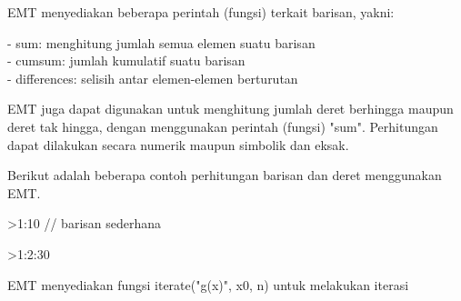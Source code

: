 \documentclass{article}
\begin{document}
\begin{eulernotebook}
\begin{eulercomment}
\begin{eulercomment}
\begin{eulercomment}
\begin{eulercomment}
\begin{eulercomment}
EMT menyediakan beberapa perintah (fungsi) terkait barisan, yakni:

- sum: menghitung jumlah semua elemen suatu barisan\\
- cumsum: jumlah kumulatif suatu barisan\\
- differences: selisih antar elemen-elemen berturutan

EMT juga dapat digunakan untuk menghitung jumlah deret berhingga
maupun deret tak hingga, dengan menggunakan perintah (fungsi) "sum".
Perhitungan dapat dilakukan secara numerik maupun simbolik dan eksak.

Berikut adalah beberapa contoh perhitungan barisan dan deret
menggunakan EMT.
\end{eulercomment}
\begin{eulerprompt}
>1:10 // barisan sederhana
\end{eulerprompt}
\begin{euleroutput}
  [1,  2,  3,  4,  5,  6,  7,  8,  9,  10]
\end{euleroutput}
\begin{eulerprompt}
>1:2:30
\end{eulerprompt}
\begin{euleroutput}
  [1,  3,  5,  7,  9,  11,  13,  15,  17,  19,  21,  23,  25,  27,  29]
\end{euleroutput}
\begin{eulercomment}
EMT menyediakan fungsi iterate("g(x)", x0, n) untuk melakukan iterasi


\end{eulercomment}
\end{eulercomment}
\end{eulercomment}
\end{eulercomment}
\end{eulercomment}
\end{eulernotebook}
\end{document}
